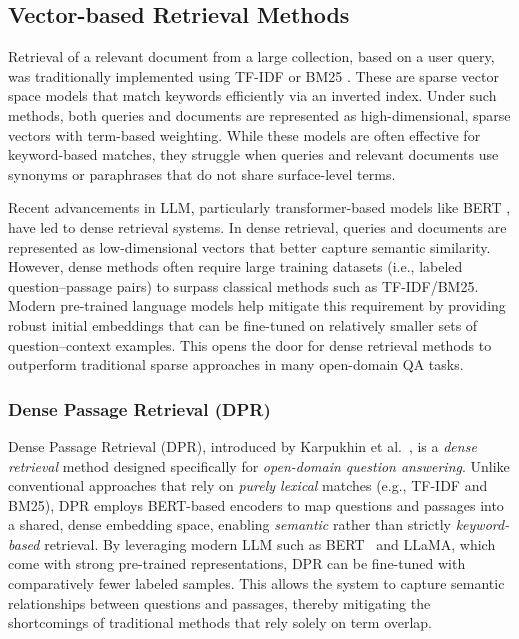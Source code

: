 \subsection{Vector-based Retrieval Methods}


Retrieval of a relevant document from a large collection, based on a user query, was traditionally implemented using TF-IDF or BM25 \cite{bm25}. These are sparse vector space models that match keywords efficiently via an inverted index. Under such methods, both queries and documents are represented as high-dimensional, sparse vectors with term-based weighting. While these models are often effective for keyword-based matches, they struggle when queries and relevant documents use synonyms or paraphrases that do not share surface-level terms.

Recent advancements in \ac{LLM}, particularly transformer-based models like BERT \cite{bertpretrainingdeepbidirectional}, have led to dense retrieval systems. In dense retrieval, queries and documents are represented as low-dimensional vectors that better capture semantic similarity. However, dense methods often require large training datasets (i.e., labeled question–passage pairs) to surpass classical methods such as TF-IDF/BM25. Modern pre-trained language models help mitigate this requirement by providing robust initial embeddings that can be fine-tuned on relatively smaller sets of question–context examples. This opens the door for dense retrieval methods to outperform traditional sparse approaches in many open-domain QA tasks.
\subsubsection{Dense Passage Retrieval (DPR)}
\label{par:dpr}
Dense Passage Retrieval (DPR), introduced by Karpukhin et al.~\cite{densepassageretrievalopendomainkarpukhin2020}, is a \textit{dense retrieval} method designed specifically for \textit{open-domain question answering}. Unlike conventional approaches that rely on \textit{purely lexical} matches (e.g., TF-IDF and BM25), DPR employs BERT-based encoders to map questions and passages into a shared, dense embedding space, enabling \textit{semantic} rather than strictly \textit{keyword-based} retrieval. By leveraging modern \ac{LLM} such as BERT~\cite{bertpretrainingdeepbidirectional} and LLaMA, which come with strong pre-trained representations, DPR can be fine-tuned with comparatively fewer labeled samples. This allows the system to capture semantic relationships between questions and passages, thereby mitigating the shortcomings of traditional methods that rely solely on term overlap.


